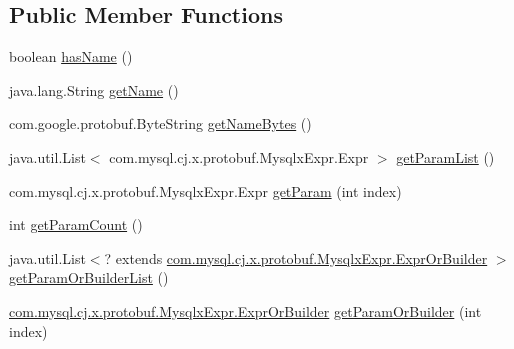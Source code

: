\subsection*{Public Member Functions}
\begin{DoxyCompactItemize}
\item 
boolean \mbox{\hyperlink{interfacecom_1_1mysql_1_1cj_1_1x_1_1protobuf_1_1_mysqlx_expr_1_1_operator_or_builder_a2308890fccea041bbce31293bcfded83}{has\+Name}} ()
\item 
java.\+lang.\+String \mbox{\hyperlink{interfacecom_1_1mysql_1_1cj_1_1x_1_1protobuf_1_1_mysqlx_expr_1_1_operator_or_builder_aecb946c8fdf6c7d314942d25941deec4}{get\+Name}} ()
\item 
com.\+google.\+protobuf.\+Byte\+String \mbox{\hyperlink{interfacecom_1_1mysql_1_1cj_1_1x_1_1protobuf_1_1_mysqlx_expr_1_1_operator_or_builder_a31f353c807879eb77d57c0898ae821ba}{get\+Name\+Bytes}} ()
\item 
java.\+util.\+List$<$ com.\+mysql.\+cj.\+x.\+protobuf.\+Mysqlx\+Expr.\+Expr $>$ \mbox{\hyperlink{interfacecom_1_1mysql_1_1cj_1_1x_1_1protobuf_1_1_mysqlx_expr_1_1_operator_or_builder_ac5bc01a4170ea26605388009e8415c48}{get\+Param\+List}} ()
\item 
com.\+mysql.\+cj.\+x.\+protobuf.\+Mysqlx\+Expr.\+Expr \mbox{\hyperlink{interfacecom_1_1mysql_1_1cj_1_1x_1_1protobuf_1_1_mysqlx_expr_1_1_operator_or_builder_a001ce5d1371b875260271c0a89249677}{get\+Param}} (int index)
\item 
int \mbox{\hyperlink{interfacecom_1_1mysql_1_1cj_1_1x_1_1protobuf_1_1_mysqlx_expr_1_1_operator_or_builder_a4b06abfea4b0c595fba4e4efa20706b4}{get\+Param\+Count}} ()
\item 
java.\+util.\+List$<$? extends \mbox{\hyperlink{interfacecom_1_1mysql_1_1cj_1_1x_1_1protobuf_1_1_mysqlx_expr_1_1_expr_or_builder}{com.\+mysql.\+cj.\+x.\+protobuf.\+Mysqlx\+Expr.\+Expr\+Or\+Builder}} $>$ \mbox{\hyperlink{interfacecom_1_1mysql_1_1cj_1_1x_1_1protobuf_1_1_mysqlx_expr_1_1_operator_or_builder_aefefe9d4108437c51d15ec6473059b8b}{get\+Param\+Or\+Builder\+List}} ()
\item 
\mbox{\hyperlink{interfacecom_1_1mysql_1_1cj_1_1x_1_1protobuf_1_1_mysqlx_expr_1_1_expr_or_builder}{com.\+mysql.\+cj.\+x.\+protobuf.\+Mysqlx\+Expr.\+Expr\+Or\+Builder}} \mbox{\hyperlink{interfacecom_1_1mysql_1_1cj_1_1x_1_1protobuf_1_1_mysqlx_expr_1_1_operator_or_builder_a60b5394469a0c2770f01b3221823aeff}{get\+Param\+Or\+Builder}} (int index)
\end{DoxyCompactItemize}


